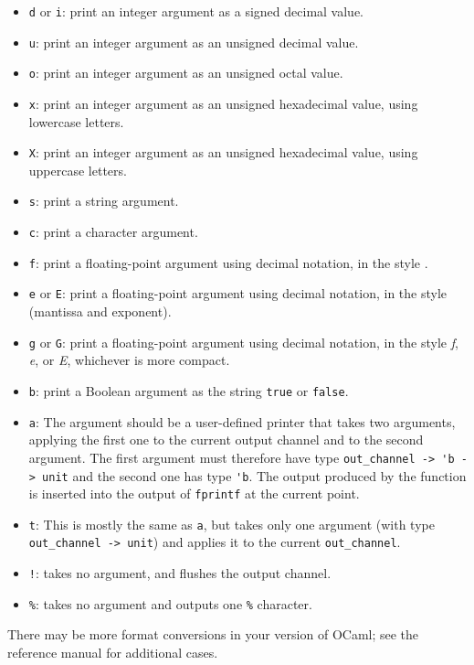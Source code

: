 \begin{indent}
\begin{itemize}
\item \lstinline/d/ or \lstinline/i/:
print an integer argument as a signed decimal value.
\item \lstinline/u/:
print an integer argument as an unsigned decimal value.
\item \lstinline/o/:
print an integer argument as an unsigned octal value.
\item \lstinline/x/:
print an integer argument as an unsigned hexadecimal value, using
lowercase letters.
\item \lstinline/X/:
print an integer argument as an unsigned hexadecimal value, using
uppercase letters.
\item \lstinline/s/:
print a string argument.
\item \lstinline/c/:
print a character argument.
\item \lstinline/f/:
print a floating-point argument using decimal notation, in the
style .
\item \lstinline/e/ or \lstinline/E/:
print a floating-point argument using decimal notation, in the
style  (mantissa and exponent).
\item \lstinline/g/ or \lstinline/G/:
print a floating-point argument using decimal notation, in the
style \emph{f}, \emph{e}, or \emph{E}, whichever is more compact.
\item \lstinline/b/:
print a Boolean argument as the string \hbox{\lstinline$true$}
or \hbox{\lstinline$false$}.
\item \lstinline/a/:
%
The argument should be a user-defined printer that takes two arguments, applying the first one to
the current output channel and to the second argument. The first argument must therefore have type
\hbox{\lstinline/out_channel -> 'b -> unit/}
and the second one has type \hbox{\lstinline/'b/}. The output produced
by the function is inserted into the output
of \hbox{\lstinline$fprintf$} at the current point.

\item \lstinline/t/:
%
This is mostly the same as \hbox{\lstinline+a+}, but takes only one argument (with
type \hbox{\lstinline/out_channel -> unit/}) and applies it to the
current \hbox{\lstinline/out_channel/}.
\item \lstinline/!/:
takes no argument, and flushes the output channel.
\item \lstinline/%/:
takes no argument and outputs one \hbox{\lstinline+%+} character.
\end{itemize}
\end{indent}
%
There may be more format conversions in your version of OCaml; see the
reference manual for additional cases.

